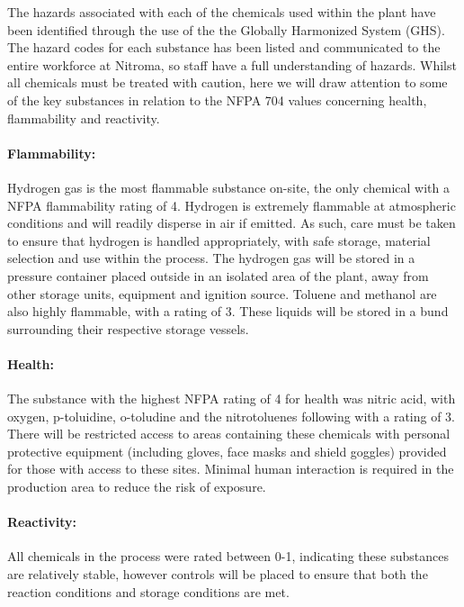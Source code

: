 The hazards associated with each of the chemicals used within the plant have been identified through the use of the the Globally Harmonized System (GHS). The hazard codes for each substance has been listed and communicated to the entire workforce at Nitroma, so staff have a full understanding of hazards. Whilst all chemicals must be treated with caution, here we will draw attention to some of the key substances in relation to the NFPA 704 values concerning health, flammability and reactivity. 

\paragraph{Flammability:}

Hydrogen gas is the most flammable substance on-site, the only chemical with a NFPA flammability rating of 4.  Hydrogen is extremely flammable at atmospheric conditions and will readily disperse in air if emitted. As such, care must be taken to ensure that hydrogen is handled appropriately, with safe storage, material selection and use within the process. The hydrogen gas will be stored in a pressure container placed outside in an isolated area of the plant, away from other storage units, equipment and ignition source.  Toluene and methanol are also highly flammable, with a rating of 3. These liquids will be stored in a bund surrounding their respective storage vessels. 



\paragraph{Health:}

The substance with the highest NFPA rating of 4 for health was nitric acid, with oxygen, p-toluidine, o-toludine and the nitrotoluenes  following with a rating of 3. There will be restricted access to areas containing these chemicals with personal protective equipment (including gloves, face masks and shield goggles) provided for those with access to these sites. Minimal human interaction is required in the production area to reduce the risk of exposure.

\paragraph{Reactivity:}

All chemicals in the process were rated between 0-1, indicating these substances are relatively stable, however controls will be placed to ensure that both the reaction conditions and storage conditions are met. 

